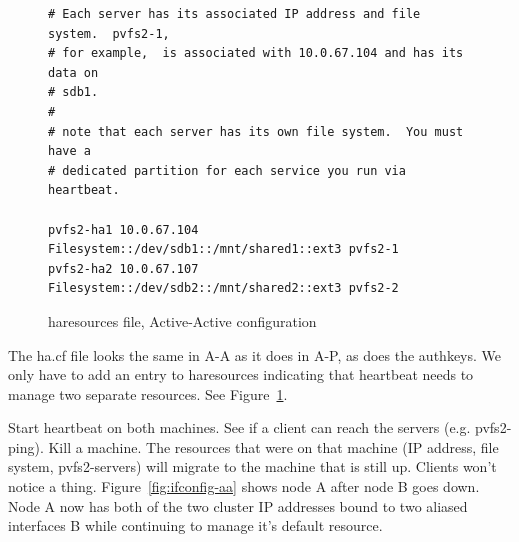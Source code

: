 \documentclass[11pt]{article}
\begin{document}
\begin{figure}
\begin{scriptsize}
\begin{verbatim}
# Each server has its associated IP address and file system.  pvfs2-1,
# for example,  is associated with 10.0.67.104 and has its data on
# sdb1.  
# 
# note that each server has its own file system.  You must have a
# dedicated partition for each service you run via heartbeat.

pvfs2-ha1 10.0.67.104 Filesystem::/dev/sdb1::/mnt/shared1::ext3 pvfs2-1
pvfs2-ha2 10.0.67.107 Filesystem::/dev/sdb2::/mnt/shared2::ext3 pvfs2-2
\end{verbatim}
\end{scriptsize}
\caption{haresources file, Active-Active configuration}
\label{fig:haresources-aa}
\end{figure}

The ha.cf file looks the same in A-A as it does in A-P, as does the
authkeys.  We only have to add an entry to haresources indicating that
heartbeat needs to manage two separate resources.  See
Figure~\ref{fig:haresources-aa}.

Start heartbeat on both machines.  See if a client can reach the servers
(e.g. pvfs2-ping).  Kill a machine.  The resources that were on that
machine (IP address, file system, pvfs2-servers) will migrate to the
machine that is still up.  Clients won't notice a thing.
Figure~\ref{fig:ifconfig-aa} shows node A after node B goes down.  Node A
now has both of the two cluster IP addresses bound to two aliased
interfaces B while continuing to manage it's default resource.
\end{document}
